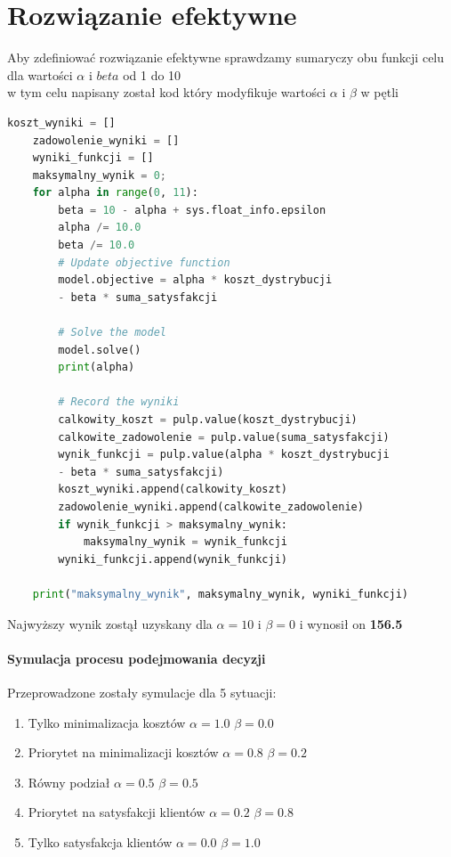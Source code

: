 \section{Rozwiązanie efektywne}
Aby zdefiniować rozwiązanie efektywne sprawdzamy sumaryczy obu funkcji celu dla wartości $\alpha$ i $beta$ od 1 do 10 \\ 
w tym celu napisany został kod który modyfikuje wartości $\alpha$ i $\beta$ w pętli 

\begin{lstlisting}[language=Python, caption={Wyznaczanie alpha i beta}]
    koszt_wyniki = []
    zadowolenie_wyniki = []
    wyniki_funkcji = []
    maksymalny_wynik = 0;
    for alpha in range(0, 11):
        beta = 10 - alpha + sys.float_info.epsilon
        alpha /= 10.0
        beta /= 10.0
        # Update objective function
        model.objective = alpha * koszt_dystrybucji
        - beta * suma_satysfakcji
    
        # Solve the model
        model.solve()
        print(alpha)
    
        # Record the wyniki
        calkowity_koszt = pulp.value(koszt_dystrybucji)
        calkowite_zadowolenie = pulp.value(suma_satysfakcji)
        wynik_funkcji = pulp.value(alpha * koszt_dystrybucji
        - beta * suma_satysfakcji)
        koszt_wyniki.append(calkowity_koszt)
        zadowolenie_wyniki.append(calkowite_zadowolenie)
        if wynik_funkcji > maksymalny_wynik:
            maksymalny_wynik = wynik_funkcji
        wyniki_funkcji.append(wynik_funkcji)
        
    print("maksymalny_wynik", maksymalny_wynik, wyniki_funkcji)

\end{lstlisting}
Najwyższy wynik zostął uzyskany dla $\alpha = 10$ i $\beta = 0$ i wynosił on \textbf{156.5}

\paragraph{Symulacja procesu podejmowania decyzji}
Przeprowadzone zostały symulacje dla 5 sytuacji:
\begin{enumerate}
    \item Tylko minimalizacja kosztów $\alpha = 1.0$ $\beta = 0.0$
    \item Priorytet na minimalizacji kosztów $\alpha = 0.8$ $\beta = 0.2$
    \item Równy podział $\alpha = 0.5$ $\beta = 0.5$
    \item Priorytet na satysfakcji klientów $\alpha = 0.2$ $\beta = 0.8$
    \item Tylko satysfakcja klientów $\alpha = 0.0$ $\beta = 1.0$
\end{enumerate}

